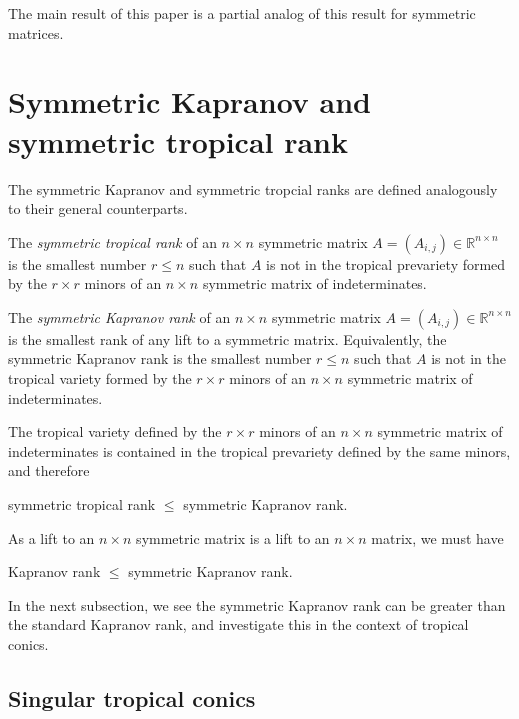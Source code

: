 \documentclass{article}
\begin{document}
The main result of this paper is a partial analog of this result for symmetric matrices.

\section{Symmetric Kapranov and symmetric tropical rank}

The symmetric Kapranov and symmetric tropcial ranks are defined analogously to their general counterparts.

The \emph{symmetric tropical rank} of an $n \times n$ symmetric matrix $A = (A_{i,j}) \in \mathbb{R}^{n \times n}$ is the smallest number $r \leq n$ such that $A$ is not in the tropical prevariety formed by the $r \times r$ minors of an $n \times n$ symmetric matrix of indeterminates.

The \emph{symmetric Kapranov rank} of an $n \times n$ symmetric matrix $A = (A_{i,j}) \in \mathbb{R}^{n \times n}$ is the smallest rank of any lift to a symmetric matrix. Equivalently, the symmetric Kapranov rank is the smallest number $r \leq n$ such that $A$ is not in the tropical variety formed by the $r \times r$ minors of an $n \times n$ symmetric matrix of indeterminates.

The tropical variety defined by the $r \times r$ minors of an $n \times n$ symmetric matrix of indeterminates is contained in the tropical prevariety defined by the same minors, and therefore
\begin{center}
  symmetric tropical rank $\leq$ symmetric Kapranov rank.
\end{center}

As a lift to an $n \times n$ symmetric matrix is a lift to an $n \times n$ matrix, we must have
\begin{center}
  Kapranov rank $\leq$ symmetric Kapranov rank.
\end{center}
In the next subsection, we see the symmetric Kapranov rank can be greater than the standard Kapranov rank, and investigate this in the context of tropical conics.

\subsection{Singular tropical conics}
\end{document}
